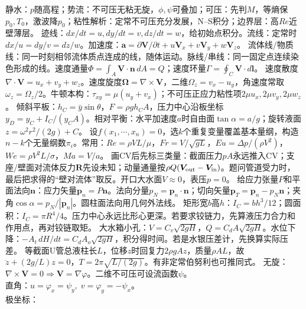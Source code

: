 静水：$p$随高程；势流：不可压无粘无旋，$\phi,\psi$可叠加；可压：先判$M$，等熵保$p_0,T_0$，激波降$p_0$；粘性解析：定常不可压充分发展，N--S积分；边界层：高$Re$近壁薄层。
迹线：$dx/dt=u,dy/dt=v,dz/dt=w$，给初始点积分。流线：定常时$dx/u=dy/v=dz/w$。加速度：$\bm a=\partial\bm V/\partial t+u\bm V_x+v\bm V_y+w\bm V_z$。
流体线/物质线：同一时刻相邻流体质点连成的线，随体运动。脉线/串线：同一固定点连续染色形成的线。速度通量$\Phi=\int_A\bm V\cdot\bm n\,dA=Q$；速度环量$\Gamma=\oint_C\bm V\cdot d\bm l$。
速度散度$\nabla\cdot\bm V=u_x+v_y+w_z$。速度旋度$\bm\Omega=\nabla\times\bm V$，二维$\Omega_z=v_x-u_y$，角速度常取$\omega_z=\Omega_z/2$。牛顿本构：$\tau_{xy}=\mu(u_y+v_x)$；不可压正应力粘性项$2\mu u_x,2\mu v_y,2\mu w_z$。
倾斜平板：$h_C=\bar y\sin\theta$，$F=\rho gh_CA$，压力中心沿板坐标$y_D=y_C+I_C/(y_CA)$。相对平衡：水平加速度$a$时自由面$\tan\alpha=a/g$；旋转液面$z=\omega^2r^2/(2g)+C$。
设$f(x_1,\cdots,x_n)=0$，选$k$个重复变量覆盖基本量纲，构造$n-k$个无量纲数$\pi_i$。常用：$Re=\rho VL/\mu$，$Fr=V/\sqrt{gL}$，$Eu=\Delta p/(\rho V^2)$，$We=\rho V^2L/\sigma$，$Ma=V/a$。
画CV后先标三类量：截面压力$pA$永远推入CV；支座/壁面对流体反力$\bm R$先设未知；动量通量按$\rho Q(\bm V_{\rm out}-\bm V_{\rm in})$。题问管道受力时，最后把求得的“壁对流体”取反。开口大水面$V\approx0$，表压$p=0$。
给应力张量$P$和平面法向$\bm n$：应力矢量$\bm p_n=P\bm n$。法向分量$p_N=\bm p_n\cdot\bm n$；切向矢量$\bm p_T=\bm p_n-p_N\bm n$；夹角$\cos\alpha=p_N/|\bm p_n|$。圆柱面法向用几何外法线。
矩形宽$b$高$h$：$I_C=bh^3/12$；圆面积：$I_C=\pi R^4/4$。压力中心永远比形心更深。若要求铰链力，先算液压力合力和作用点，再对铰链取矩。
大水箱小孔：$V=C_v\sqrt{2gH}$，$Q=C_dA\sqrt{2gH}$。水位下降：$-A_t\,dH/dt=C_dA_o\sqrt{2gH}$，积分得时间。若是水银压差计，先换算实际压差。
等截面U管总液柱长$L$，位移$z$时回复力$2\rho gAz$，质量$\rho AL$，故$\ddot z+(2g/L)z=0$，$T=2\pi\sqrt{L/(2g)}$。有非定常伯努利也可推同式。
\schemepotential
{}
无旋：$\nabla\times\bm V=0\Rightarrow \bm V=\nabla\varphi$。二维不可压可设流函数$\psi$。\\
直角：$u=\varphi_x=\psi_y,\;v=\varphi_y=-\psi_x$。\\
极坐标：

